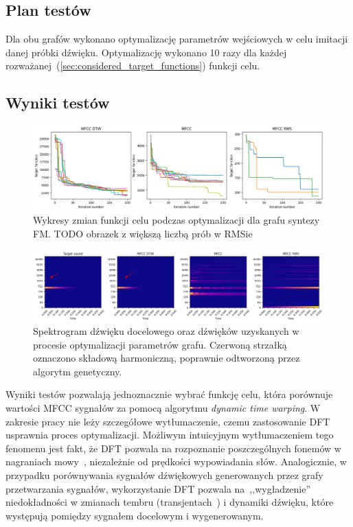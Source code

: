 \subsection{Plan testów}

Dla obu grafów wykonano optymalizację parametrów wejściowych w celu imitacji danej
próbki dźwięku. Optymalizację wykonano 10 razy dla każdej rozważanej~(\ref{sec:considered_target_functions})
funkcji celu.

\subsection{Wyniki testów}

\begin{figure}[H]
    \centering
    \includegraphics[width=1.0\linewidth]{rys03/target_functions_progress.png}
    \caption{
      Wykresy zmian funkcji celu podczas optymalizacji dla grafu syntezy FM\@.
      TODO obrazek z większą liczbą prób w RMSie
    }\label{fig:param_optimisation_results_target_fun_plots}
\end{figure}

\begin{figure}[H]
    \centering
    \includegraphics[width=1.0\linewidth]{rys03/spectro_results_fm.png}
    \caption{
      Spektrogram dźwięku docelowego oraz dźwięków uzyskanych w procesie optymalizacji parametrów grafu.
      Czerwoną strzałką oznaczono składową harmoniczną, poprawnie odtworzoną przez algorytm genetyczny.
    }\label{fig:param_optimisation_results_spectrograms}
\end{figure}

Wyniki testów pozwalają jednoznacznie wybrać funkcję celu, która porównuje wartości MFCC
sygnałów za pomocą algorytmu \textit{dynamic time warping}. W zakresie pracy nie leży szczegółowe
wytłumaczenie, czemu zastosowanie DFT usprawnia proces optymalizacji. Możliwym intuicyjnym
wytłumaczeniem tego fenomenu jest fakt, że DFT pozwala na rozpoznanie poszczególnych
fonemów w nagraniach mowy~\cite{mfcc_dtw}, niezależnie od prędkości wypowiadania słów. 
Analogicznie, w przypadku porównywania sygnałów dźwiękowych generowanych przez grafy
przetwarzania sygnałów, wykorzystanie DFT pozwala na~,,wygładzenie'' niedokładności
w zmianach tembru (transjentach~\cite{transient_music_theory}) i dynamiki dźwięku,
które występują pomiędzy sygnałem docelowym i wygenerowanym.
